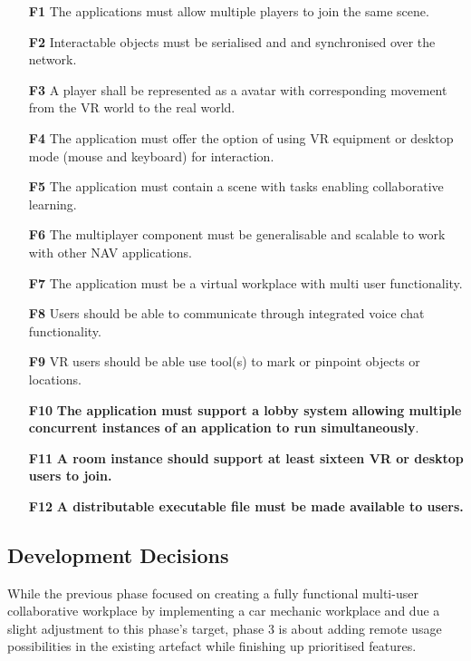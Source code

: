 \begin{enumerate}
  \setlength\itemsep{0em}
    \item [\textbf{F1}] The applications must allow multiple players to join the same scene.
    \item [\textbf{F2}] Interactable objects must be serialised and and synchronised over the network.
    \item [\textbf{F3}] A player shall be represented as a avatar with corresponding movement from the VR world to the real world.
    \item [\textbf{F4}] The application must offer the option of using VR equipment or desktop mode (mouse and keyboard) for interaction.
    \item [\textbf{F5}] The application must contain a scene with tasks enabling collaborative learning.
    \item [\textbf{F6}] The multiplayer component must be generalisable and scalable to work with other NAV applications.
    \item [\textbf{F7}] The application must be a virtual workplace with multi user functionality.
    \item [\textbf{F8}] Users should be able to communicate through integrated voice chat functionality.
    \item [\textbf{F9}] VR users should be able use tool(s) to mark or pinpoint objects or locations.
    \item [\textbf{F10}] \textbf{The application must support a lobby system allowing multiple concurrent instances of an application to run simultaneously}.
    \item [\textbf{F11}] \textbf{A room instance should support at least sixteen VR or desktop users to join.}
    \item [\textbf{F12}] \textbf{A distributable executable file must be made available to users.}
\end{enumerate}




\subsection{Development Decisions}
While the previous phase focused on creating a fully functional multi-user collaborative workplace by implementing a car mechanic workplace and due a slight adjustment to this phase's target, phase 3 is about adding remote usage possibilities in the existing artefact while finishing up prioritised features.  


